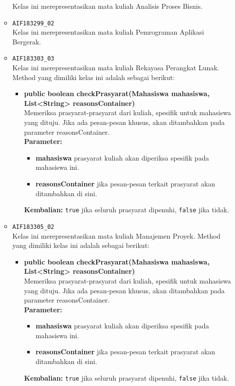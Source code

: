 \begin{enumerate}
\begin{itemize}
		Kelas ini merepresentasikan mata kuliah Analisis Proses Bisnis.
		\item \texttt{AIF183299\_02} \\
		Kelas ini merepresentasikan mata kuliah Pemrograman Aplikasi Bergerak.
		\item \texttt{AIF183303\_03} \\
		Kelas ini merepresentasikan mata kuliah Rekayasa Perangkat Lunak. Method yang dimiliki kelas ini adalah sebagai berikut: 
		\begin{itemize}
			\item \textbf{public boolean checkPrasyarat(Mahasiswa mahasiswa, List<String> reasonsContainer)}\\
			Memeriksa prasyarat-prasyarat dari kuliah, spesifik untuk mahasiswa yang dituju. Jika ada pesan-pesan khusus, akan ditambahkan pada parameter reasonsContainer.\\
			\textbf{Parameter:}
			\begin{itemize}
				\item \textbf{mahasiswa} prasyarat kuliah akan diperiksa spesifik pada mahasiswa ini.
				\item \textbf{reasonsContainer} jika pesan-pesan terkait prasyarat akan ditambahkan di sini.
			\end{itemize}
			\textbf{Kembalian:} \texttt{true} jika seluruh prasyarat dipenuhi, \texttt{false} jika tidak.
		\end{itemize}
		\item \texttt{AIF183305\_02} \\
		Kelas ini merepresentasikan mata kuliah Manajemen Proyek. Method yang dimiliki kelas ini adalah sebagai berikut: 
		\begin{itemize}
			\item \textbf{public boolean checkPrasyarat(Mahasiswa mahasiswa, List<String> reasonsContainer)}\\
			Memeriksa prasyarat-prasyarat dari kuliah, spesifik untuk mahasiswa yang dituju. Jika ada pesan-pesan khusus, akan ditambahkan pada parameter reasonsContainer.\\
			\textbf{Parameter:}
			\begin{itemize}
				\item \textbf{mahasiswa} prasyarat kuliah akan diperiksa spesifik pada mahasiswa ini.
				\item \textbf{reasonsContainer} jika pesan-pesan terkait prasyarat akan ditambahkan di sini.
			\end{itemize}
			\textbf{Kembalian:} \texttt{true} jika seluruh prasyarat dipenuhi, \texttt{false} jika tidak.

\end{itemize}
\end{itemize}
\end{enumerate}
